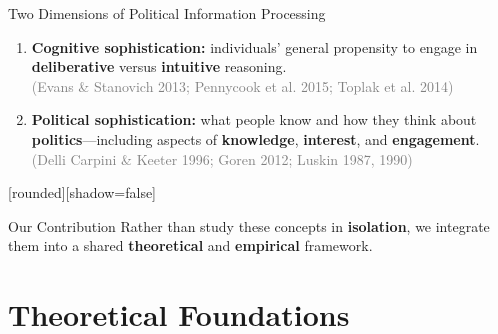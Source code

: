 \documentclass[10pt,table]{beamer}
\begin{document}
\begin{frame}[t, fragile]{Two Dimensions of Political Information Processing}

\setlength{\leftmargini}{18pt}
\setlength{\rightmargini}{20pt}
\vspace{0.75em} 

\begin{enumerate}
    \item \alert{\bf Cognitive sophistication:} individuals' general propensity to engage in \textbf{deliberative} versus \textbf{intuitive} reasoning. \vspace{0.25em} \\ \scriptsize{\textcolor{gray}{(Evans \& Stanovich 2013; Pennycook et al. 2015; Toplak et al. 2014)}} \normalsize  \pause  \bigskip
    \item \alert{\bf Political sophistication:} what people know and how they think about \textbf{politics}---including aspects of \textbf{knowledge}, \textbf{interest}, and \textbf{engagement}. \vspace{0.25em} \\ \scriptsize{\textcolor{gray}{(Delli Carpini \& Keeter 1996; Goren 2012; Luskin 1987, 1990)}} \normalsize \pause \bigskip
\end{enumerate}

\vspace{-1.5em}
[rounded][shadow=false]
\begin{center}
\begin{minipage}{8cm}
\begin{block}{Our Contribution}
    Rather than study these concepts in \textbf{isolation}, we integrate them into a shared \textbf{theoretical} and \textbf{empirical} framework.
\end{block}
\end{minipage}
\end{center}
    
\end{frame}

\section{Theoretical Foundations}
\end{document}
